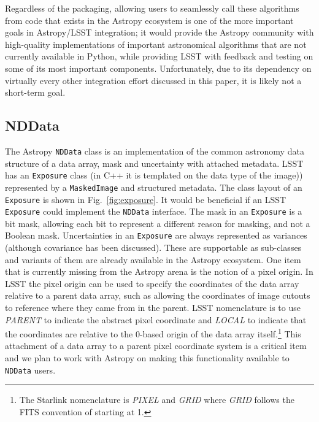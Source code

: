 \documentclass[]{spie}  %
\begin{document}
Regardless of the packaging, allowing users to seamlessly call these algorithms from code that exists in the Astropy ecosystem is one of the more important goals in Astropy/LSST integration; it would provide the Astropy community with high-quality implementations of important astronomical algorithms that are not currently available in Python, while providing LSST with feedback and testing on some of its most important components.
Unfortunately, due to its dependency on virtually every other integration effort discussed in this paper, it is likely not a short-term goal.

\subsection{NDData}

The Astropy \texttt{NDData} class is an implementation of the common astronomy data structure\cite{2015A&C....12..146J} of a data array, mask and uncertainty with attached metadata.
LSST has an \texttt{Exposure} class (in C++ it is templated on the data type of the image)) represented by a \texttt{MaskedImage} and structured metadata.
The class layout of an \texttt{Exposure} is shown in Fig.~\ref{fig:exposure}.
It would be beneficial if an LSST \texttt{Exposure} could implement the \texttt{NDData} interface.
The mask in an \texttt{Exposure} is a bit mask, allowing each bit to represent a different reason for masking, and not a Boolean mask.
Uncertainties in an \texttt{Exposure} are always represented as variances (although covariance has been discussed).
These are supportable as sub-classes and variants of them are already available in the Astropy ecosystem.
One item that is currently missing from the Astropy arena is the notion of a pixel origin.
In LSST the pixel origin can be used to specify the coordinates of the data array relative to a parent data array, such as allowing the coordinates of image cutouts to reference where they came from in the parent.
LSST nomenclature is to use \emph{PARENT} to indicate the abstract pixel coordinate and \emph{LOCAL} to indicate that the coordinates are relative to the 0-based origin of the data array itself.\footnote{The Starlink nomenclature\cite{2015A&C....12..146J} is \emph{PIXEL} and \emph{GRID} where \emph{GRID} follows the FITS convention of starting at 1.}
This attachment of a data array to a parent pixel coordinate system is a critical item and we plan to work with Astropy on making this functionality available to \texttt{NDData} users.
\end{document}
